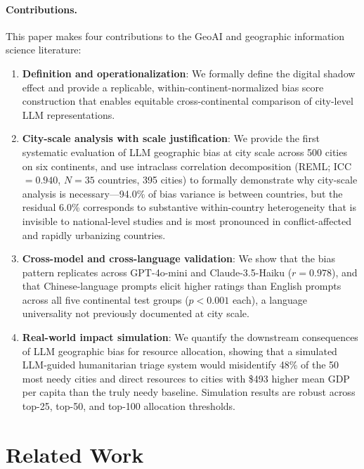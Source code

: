 \documentclass[12pt]{article}
\begin{document}
\paragraph{Contributions.} This paper makes four contributions to the GeoAI and geographic information science literature:
\begin{enumerate}
    \item \textbf{Definition and operationalization}: We formally define the digital shadow effect and provide a replicable, within-continent-normalized bias score construction that enables equitable cross-continental comparison of city-level LLM representations.
    \item \textbf{City-scale analysis with scale justification}: We provide the first systematic evaluation of LLM geographic bias at city scale across 500 cities on six continents, and use intraclass correlation decomposition (REML; ICC $= 0.940$, $N = 35$ countries, 395 cities) to formally demonstrate why city-scale analysis is necessary---94.0\% of bias variance is between countries, but the residual 6.0\% corresponds to substantive within-country heterogeneity that is invisible to national-level studies and is most pronounced in conflict-affected and rapidly urbanizing countries.
    \item \textbf{Cross-model and cross-language validation}: We show that the bias pattern replicates across GPT-4o-mini and Claude-3.5-Haiku ($r = 0.978$), and that Chinese-language prompts elicit higher ratings than English prompts across all five continental test groups ($p < 0.001$ each), a language universality not previously documented at city scale.
    \item \textbf{Real-world impact simulation}: We quantify the downstream consequences of LLM geographic bias for resource allocation, showing that a simulated LLM-guided humanitarian triage system would misidentify 48\% of the 50 most needy cities and direct resources to cities with \$493 higher mean GDP per capita than the truly needy baseline. Simulation results are robust across top-25, top-50, and top-100 allocation thresholds.
\end{enumerate}

\section{Related Work}
\label{sec:related}
\end{document}
